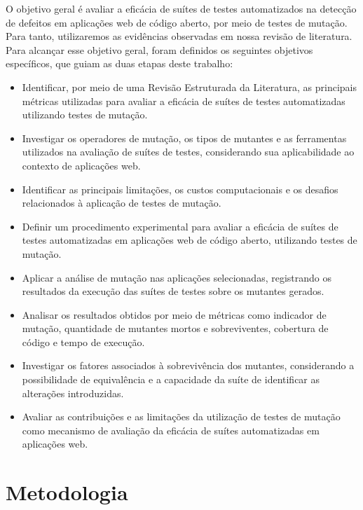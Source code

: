 O objetivo geral é avaliar a eficácia de suítes de testes automatizados na detecção de defeitos em aplicações web de código aberto, por meio de testes de mutação. Para tanto, utilizaremos as evidências  observadas em nossa revisão de literatura.
Para alcançar esse objetivo geral, foram definidos os seguintes objetivos específicos, que guiam as duas etapas deste trabalho:
\begin{itemize}

    \item Identificar, por meio de uma  Revisão Estruturada da Literatura, as principais métricas utilizadas para avaliar a eficácia de suítes de testes automatizadas utilizando testes de mutação.

    \item Investigar os operadores de mutação, os tipos de mutantes e as ferramentas utilizados na avaliação de suítes de testes, considerando sua aplicabilidade ao contexto de aplicações web.

    \item Identificar as principais limitações, os custos computacionais e os desafios relacionados à aplicação de testes de mutação.

    \item Definir um procedimento experimental para avaliar a eficácia de suítes de testes automatizadas em aplicações web de código aberto, utilizando testes de mutação.

    \item Aplicar a análise de mutação nas aplicações selecionadas, registrando os resultados da execução das suítes de testes sobre os mutantes gerados.

    \item Analisar os resultados obtidos por meio de métricas como indicador de mutação, quantidade de mutantes mortos e sobreviventes, cobertura de código e tempo de execução.

    \item Investigar os fatores associados à sobrevivência dos mutantes, considerando a possibilidade de equivalência e a capacidade da suíte de identificar as alterações introduzidas.

    \item Avaliar as contribuições e as limitações da utilização de testes de mutação como mecanismo de avaliação da eficácia de suítes automatizadas em aplicações web.

\end{itemize}

\section{Metodologia}
\label{sec:metodologia}

